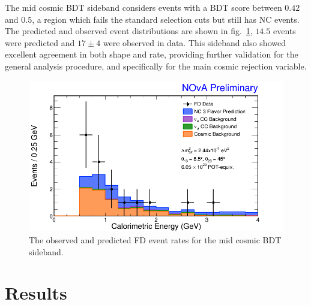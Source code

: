 The mid cosmic BDT sideband considers events with a BDT score between $0.42$ and $0.5$, a region which fails the standard selection cuts but still has NC events. The predicted and observed event distributions are shown in fig.~\ref{fig:SidebandMidBDT}, $14.5$ events were predicted and $17 \pm 4$ were observed in data. This sideband also showed excellent agreement in both shape and rate, providing further validation for the general analysis procedure, and specifically for the main cosmic rejection variable.
\begin{figure}[!h]
  \centering
  \includegraphics[width=1\textwidth]{figures/Ana01Results/FDMidBDTCalEDataMCStack.png}
  \caption[Mid Cosmic BDT Sideband]{The observed and predicted FD event rates for the mid cosmic BDT sideband.}
  \label{fig:SidebandMidBDT}
\end{figure}

\section{Results}



